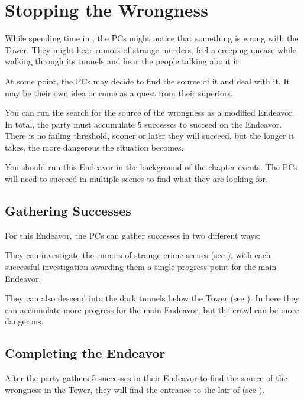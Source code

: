 \section{Stopping the Wrongness}
\label{sec:stoppingWrongness}

While spending time in \locationUrithiru{}, the PCs might notice that something is wrong with the Tower. They might hear rumors of strange murders, feel a creeping unease while walking through its tunnels and hear the people talking about it.

At some point, the PCs may decide to find the source of it and deal with it. It may be their own idea or come as a quest from their superiors.

You can run the search for the source of the wrongness as a modified Endeavor. In total, the party must accumulate 5 successes to succeed on the Endeavor. There is no failing threshold, sooner or later they will succeed, but the longer it takes, the more dangerous the situation becomes.

You should run this Endeavor in the background of the chapter events. The PCs will need to succeed in multiple scenes to find what they are looking for.




\subsection{Gathering Successes}

For this Endeavor, the PCs can gather successes in two different ways:

They can investigate the rumors of strange crime scenes (see ), with each successful investigation awarding them a single progress point for the main Endeavor.

They can also descend into the dark tunnels below the Tower (see ). In here they can accumulate more progress for the main Endeavor, but the crawl can be more dangerous.




\subsection{Completing the Endeavor}

After the party gathers 5 successes in their Endeavor to find the source of the wrongness in the Tower, they will find the entrance to the lair of \npcMidnightMotherFull{} (see ).

